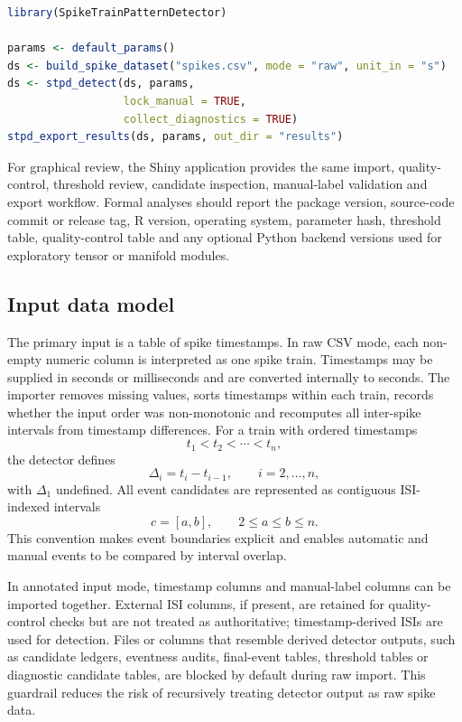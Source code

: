\documentclass[pdflatex,sn-apa]{sn-jnl}
\begin{document}
\begin{lstlisting}[language=R]
library(SpikeTrainPatternDetector)

params <- default_params()
ds <- build_spike_dataset("spikes.csv", mode = "raw", unit_in = "s")
ds <- stpd_detect(ds, params,
                  lock_manual = TRUE,
                  collect_diagnostics = TRUE)
stpd_export_results(ds, params, out_dir = "results")
\end{lstlisting}

For graphical review, the Shiny application provides the same import, quality-control, threshold review, candidate inspection, manual-label validation and export workflow. Formal analyses should report the package version, source-code commit or release tag, R version, operating system, parameter hash, threshold table, quality-control table and any optional Python backend versions used for exploratory tensor or manifold modules.

\subsection{Input data model}

The primary input is a table of spike timestamps. In raw CSV mode, each non-empty numeric column is interpreted as one spike train. Timestamps may be supplied in seconds or milliseconds and are converted internally to seconds. The importer removes missing values, sorts timestamps within each train, records whether the input order was non-monotonic and recomputes all inter-spike intervals from timestamp differences. For a train with ordered timestamps
\begin{equation}
    t_1 < t_2 < \cdots < t_n,
\end{equation}
the detector defines
\begin{equation}
    \Delta_i = t_i - t_{i-1}, \qquad i=2,\ldots,n,
\end{equation}
with $\Delta_1$ undefined. All event candidates are represented as contiguous ISI-indexed intervals
\begin{equation}
    c=[a,b], \qquad 2 \le a \le b \le n.
\end{equation}
This convention makes event boundaries explicit and enables automatic and manual events to be compared by interval overlap.

In annotated input mode, timestamp columns and manual-label columns can be imported together. External ISI columns, if present, are retained for quality-control checks but are not treated as authoritative; timestamp-derived ISIs are used for detection. Files or columns that resemble derived detector outputs, such as candidate ledgers, eventness audits, final-event tables, threshold tables or diagnostic candidate tables, are blocked by default during raw import. This guardrail reduces the risk of recursively treating detector output as raw spike data.
\end{document}
